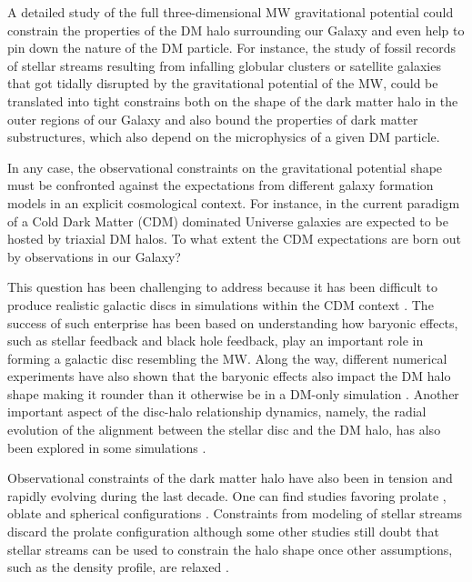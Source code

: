 \documentclass[usenatbib]{mnras}
\begin{document}
A detailed study of the full three-dimensional MW
gravitational potential could constrain the properties of the DM halo surrounding our Galaxy and even help to pin down the nature of the DM particle.
For instance, the study of fossil records of stellar streams resulting from infalling globular clusters or
satellite galaxies that got tidally disrupted by the gravitational
potential of the MW, could be translated into tight constrains 
both on the shape of the dark matter halo in the outer regions of our Galaxy \citep{1998ApJ...495..297J,1999MNRAS.307..495H, 1999MNRAS.307..877T} and also bound the properties of dark matter substructures, which also depend on the microphysics of a given DM particle.

In any case, the observational constraints on the gravitational potential shape must be confronted against the expectations from different galaxy formation models in an explicit cosmological context.
For instance, in the current paradigm of a Cold Dark Matter
(CDM) dominated Universe galaxies are expected to be hosted by
triaxial DM halos. To what extent the CDM expectations are born out by observations in our Galaxy? 

This question has been challenging to address because it has been difficult to produce realistic galactic discs in simulations within the CDM context \citep{1997ApJ...478...13N}.
The success of such enterprise has been based on understanding how baryonic effects, such as stellar feedback and black hole feedback, play an important role in forming a galactic disc resembling the MW.
Along the way, different numerical experiments have also shown that the baryonic
effects also impact the DM halo shape making it rounder
than it otherwise be in a DM-only simulation
\citep{Dubinski94,Debattista08,Kazantzidis10,Abadi10,Bryan13,Chua19,Artale19}. 
Another important aspect of the disc-halo relationship dynamics, namely, the radial evolution of the alignment between the stellar disc and the DM halo, has also been explored in some simulations \citep{Bailin05,Debattista13}. 

Observational constraints of the dark matter halo
have also been in tension and rapidly evolving during the last decade.  
One can find studies favoring prolate
\citep{Banerjee_and_Chanda_2011,Bowden_et_al._2016},  oblate
\citep{LM10,Deg_and_Widrow_2013,Vera-Ciro_and_Helmi_2013} and
spherical configurations \citep{Bovy16}.  
Constraints from modeling of stellar streams discard the prolate
configuration \citep{LM10,Pearson_et_al._2015,Bovy16} although some other studies
still doubt that stellar streams can be used to constrain the halo
shape once other assumptions, such as the density profile, are relaxed
\citep{Ibata_et_al._2013}. 
\end{document}
